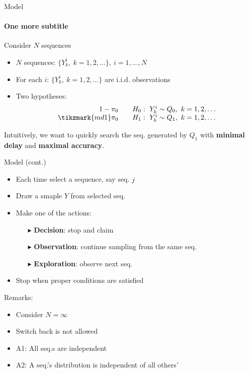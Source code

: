 \documentclass[xcolor={svgnames}]{beamer}
\begin{document}
\begin{frame}{Model}
  \framesubtitle{One more subtitle}  %
  Consider $N$ sequences

  \begin{itemize}
    \item $N$ sequences: $\{Y_k^i, ~k =1,2,\dots\}, ~i=1,\dots,N$
    \item For each $i$: $\{Y_k^i, ~k =1,2,\dots\}$ are i.i.d. observations
    \item Two hypotheses:
    $$
      \begin{array}{rl}
        1-\pi_0 &\quad H_0: ~Y_k^i \sim Q_0, ~k=1,2,\dots \\
        \tikzmark{md1}\pi_0 &\quad H_1: ~Y_k^i \sim Q_1, ~k=1,2,\dots
      \end{array}
    $$
  \end{itemize}

  \bigskip
  Intuitively, we want to quickly search the seq. generated by $Q_1$ with \alert{\textbf{minimal delay}} and \alert{\textbf{maximal accuracy}}.
\end{frame}
\begin{frame}{Model (cont.)}
  \begin{itemize}
    \item Each time select a sequence, say seq. $j$
    \item Draw a smaple $Y$ from selected seq.
    \item Make one of the actions:
    \begin{itemize}
      \item[$\blacktriangleright$] \textbf{\alert{Decision}}: stop and claim
      \item[$\blacktriangleright$] \textbf{\alert{Observation}}: continue sampling from the same seq.
      \item[$\blacktriangleright$] \textbf{\alert{Exploration}}: observe next seq.
    \end{itemize}

    \item Stop when proper conditions are satisfied
  \end{itemize}
  \pause
  Remarks:
    \begin{itemize}\itemsep-2pt
      \item Consider $N = \infty$
      \item Switch back is not allowed
      \item A1: All seq.s are independent
      \item<4-> A2: A seq.'s distribution is independent of all others'
    \end{itemize}
\end{frame}
\end{document}
